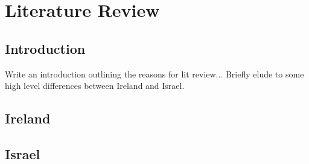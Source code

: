 \chapter{Literature Review}

\section{Introduction}

Write an introduction outlining the reasons for lit review... Briefly elude to some high level differences between Ireland and Israel.

\subsection{}
\subsection{}
\subsection{}




\section{Ireland}

\subsection{}
\subsection{}
\subsection{}




\section{Israel}

\subsection{}
\subsection{}
\subsection{}

\subsection{}